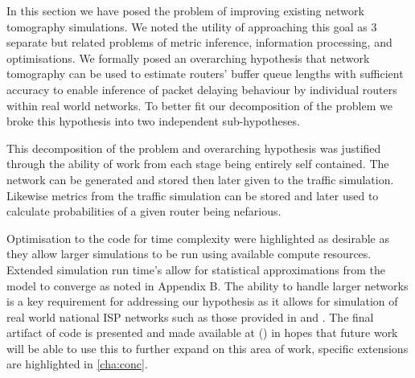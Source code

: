 In this section we have posed the problem of improving existing network tomography simulations. We noted the utility of approaching this goal as 3 separate but related problems of metric inference, information processing, and optimisations. We formally posed an overarching hypothesis that network tomography can be used to estimate routers' buffer queue lengths with sufficient accuracy to enable inference of packet delaying behaviour by individual routers within real world networks. To better fit our decomposition of the problem we broke this hypothesis into two independent sub-hypotheses.\par
This decomposition of the problem and overarching hypothesis was justified through the ability of work from each stage being entirely self contained. The network can be generated and stored then later given to the traffic simulation. Likewise metrics from the traffic simulation can be stored and later used to calculate probabilities of a given router being nefarious.\par
Optimisation to the code for time complexity were highlighted as desirable as they allow larger simulations to be run using available compute resources. Extended simulation run time's allow for statistical approximations from the model to converge as noted in Appendix B. The ability to handle larger networks is a key requirement for addressing our hypothesis as it allows for simulation of real world national ISP networks such as those provided in \cite{knight_internet_2011} and \cite{orlowski_sndlib_2007}. The final artifact of code is presented and made available at (\cite{sylvester_millar_real_2021}) in hopes that future work will be able to use this to further expand on this area of work, specific extensions are highlighted in \cref{cha:conc}.
